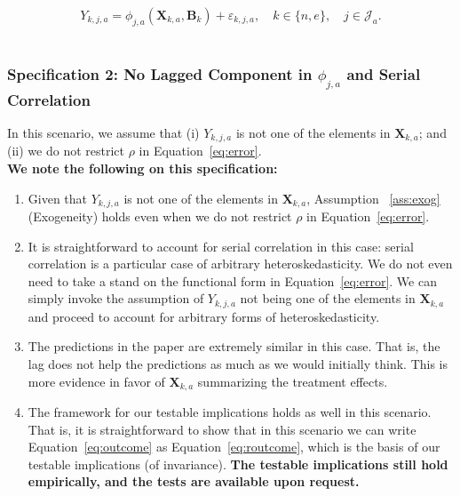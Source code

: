 \begin{equation}\label{eq:routcome}
Y_{k,j,a} = \phi_{j,a} (\bm{X}_{k,a}, \bm{B}_k) + \varepsilon_{k,j,a}, \quad k \in \{n,e\}, \quad j \in \mathcal{J}_a.
\end{equation}\\

\subsubsection{Specification 2: No Lagged Component in $\phi_{j,a}$ and Serial Correlation}

\noindent In this scenario, we assume that (i)  $Y_{k,j,a}$ is not one of the elements in $\bm{X}_{k,a}$; and (ii) we do not restrict $\rho$ in Equation~\eqref{eq:error}.\\

\noindent \textbf{We note the following on this specification:}

\begin{enumerate}

\item Given that $Y_{k,j,a}$ is not one of the elements in $\bm{X}_{k,a}$, Assumption ~\ref{ass:exog} (Exogeneity) holds even when we do not restrict $\rho$ in Equation~\eqref{eq:error}. 

\item It is straightforward to account for serial correlation in this case: serial correlation is a particular case of arbitrary heteroskedasticity. We do not even need to take a stand on the functional form in Equation~\eqref{eq:error}. We can simply invoke the assumption of $Y_{k,j,a}$ not being one of the elements in $\bm{X}_{k,a}$ and proceed to account for arbitrary forms of heteroskedasticity. 

\item The predictions in the paper are extremely similar in this case. That is, the lag does not help the predictions as much as we would initially think. This is more evidence in favor of $\bm{X}_{k,a}$ summarizing the treatment effects.

\item The framework for our testable implications holds as well in this scenario. That is, it is straightforward to show that in this scenario we can write Equation~\eqref{eq:outcome} as Equation~\eqref{eq:routcome}, which is the basis of our testable implications (of invariance). \textbf{The testable implications still hold empirically, and the tests are available upon request.}

\end{enumerate}

